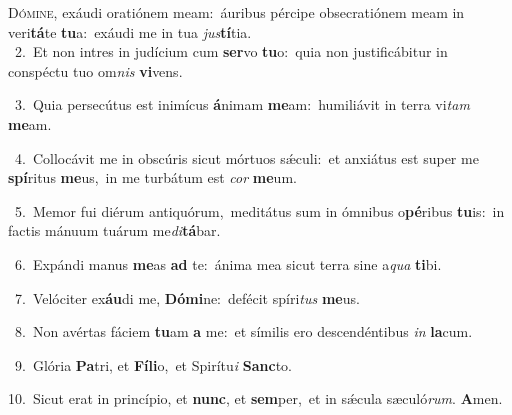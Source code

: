 \lettrine{\initial\textcolor{\initialcolor}{D}}{ómine,} exáudi oratiónem meam:~\dagger áuribus pércipe obsecratiónem meam in veri\-\textbf{tá}\-te \textbf{tu}\-a:~\star exáudi me in tua \textit{jus}\-\textbf{tí}tia.\\
{\numbfont\textcolor{\numbcolor}{~2.}}~Et non intres in judícium cum \textbf{ser}\-vo \textbf{tu}\-o:~\star quia non justificábitur in conspéctu tuo om\textit{nis} \textbf{vi}\-vens.\par
{\numbfont\textcolor{\numbcolor}{~3.}}~Quia persecútus est inimícus \textbf{á}\-nimam \textbf{me}\-am:~\star humiliávit in terra vi\textit{tam} \textbf{me}\-am.\par
{\numbfont\textcolor{\numbcolor}{~4.}}~Collocávit me in obscúris sicut mórtuos sǽculi:~\dagger et anxiátus est super me \textbf{spí}\-ritus \textbf{me}\-us,~\star in me turbátum est \textit{cor} \textbf{me}\-um.\par
{\numbfont\textcolor{\numbcolor}{~5.}}~Memor fui diérum antiquórum,~\dagger meditátus sum in ómnibus o\-\textbf{pé}\-ribus \textbf{tu}\-is:~\star in factis mánuum tuárum me\-\textit{di}\-\textbf{tá}bar.\par
{\numbfont\textcolor{\numbcolor}{~6.}}~Expándi manus \textbf{me}\-as \textbf{ad} te:~\star ánima mea sicut terra sine a\textit{qua} \textbf{ti}\-bi.\par
{\numbfont\textcolor{\numbcolor}{~7.}}~Velóciter ex\-\textbf{áu}\-di me, \textbf{Dó}\-\textbf{mi}ne:~\star defécit spíri\textit{tus} \textbf{me}\-us.\par
{\numbfont\textcolor{\numbcolor}{~8.}}~Non avértas fáciem \textbf{tu}\-am \textbf{a} me:~\star et símilis ero descendéntibus \textit{in} \textbf{la}\-cum.\par
{\numbfont\textcolor{\numbcolor}{~9.}}~Glória \textbf{Pa}\-tri, et \textbf{Fí}\-\textbf{li}o,~\star et Spirítu\textit{i} \textbf{Sanc}\-to.\par
{\numbfont\textcolor{\numbcolor}{10.}}~Sicut erat in princípio, et \textbf{nunc}\-, et \textbf{sem}\-per,~\star et in sǽcula sæculó\-\textit{rum}\-. \textbf{A}\-men.\par

